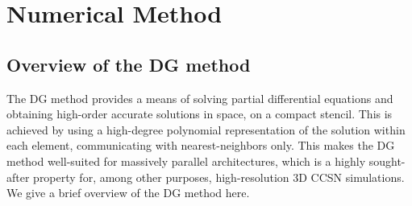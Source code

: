 \documentclass[letterpaper]{jpconf}
\newcommand{\sd}[1]{\textcolor{red}{(SD: #1)}}
\begin{document}
 \section{Numerical Method}

 \subsection{Overview of the DG method}
 The DG method provides a means of solving partial differential equations and obtaining high-order accurate solutions in space, on a compact stencil. This is achieved by using a high-degree polynomial representation of the solution within each element, communicating with nearest-neighbors only. This makes the DG method well-suited for massively parallel architectures, which is a highly sought-after property for, among other purposes, high-resolution 3D CCSN simulations. We give a brief overview of the DG method here.
\end{document}

